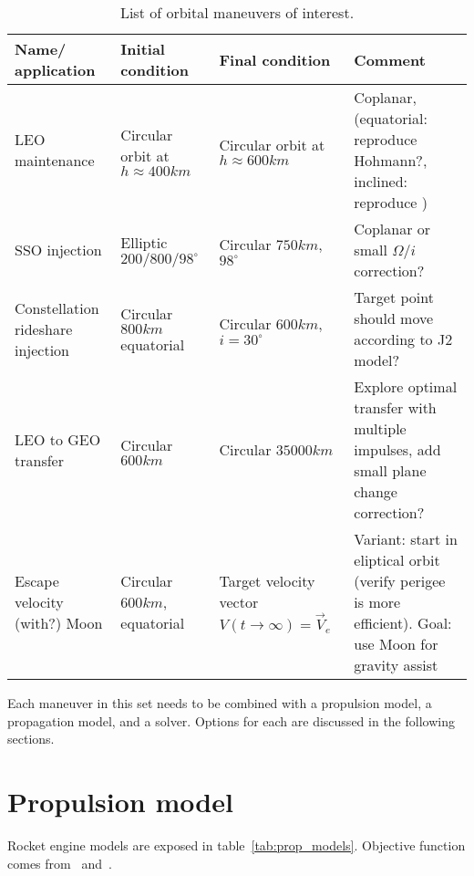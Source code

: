 \begin{table}[htpb]
    \centering
    \begin{tabular}{>{\centering\arraybackslash}m{3cm}>{\centering\arraybackslash}m{3cm}>{\centering\arraybackslash}m{3cm}>{\centering\arraybackslash}m{3cm}}\toprule
        \textbf{Name/ application} & \textbf{Initial condition} & \textbf{Final condition} & \textbf{Comment}\\ \midrule
        LEO maintenance & Circular orbit at \(h \approx 400km\) & Circular orbit at \(h \approx 600km\) & Coplanar, (equatorial: reproduce Hohmann?, inclined: reproduce \cite{sandro_quasi_circ}) \\ \midrule
        SSO injection & Elliptic \(200/800/98^\circ\) & Circular \(750km\), \(98^\circ \) & Coplanar or small \(\Omega\)/\(i\) correction? \\ \midrule
        Constellation rideshare injection & Circular \(800km\) equatorial & Circular \(600km\), \(i=30^\circ\) & Target point should move according to J2 model? \\ \midrule
        LEO to GEO transfer & Circular \(600km\) & Circular \(35000km\) & Explore optimal transfer with multiple impulses, add small plane change correction? \\ \midrule
        Escape velocity (with?) Moon & Circular \(600km\), equatorial & Target velocity vector \(V(t \rightarrow \infty) = \vec{V}_e\) & Variant: start in eliptical orbit (verify perigee is more efficient). Goal: use Moon for gravity assist \\ \bottomrule
    \end{tabular}
    \caption{List of orbital maneuvers of interest.}\label{tab:man_interest}
\end{table}

Each maneuver in this set needs to be combined with a propulsion model, a propagation model, and a solver. Options for each are discussed in the following sections.

\newpage
\section{Propulsion model}

Rocket engine models are exposed in table~\ref{tab:prop_models}. Objective function comes from~\cite{Conway_2010} and~\cite{sandro_quasi_circ}.

